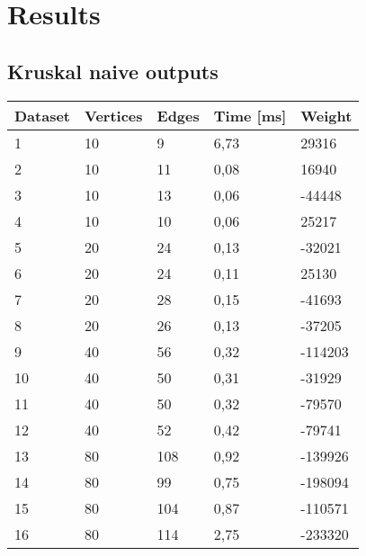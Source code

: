 \section{Results}

\subsection{Kruskal naive outputs}
\begin{longtable}{lllll}
    \textbf{Dataset} & \textbf{Vertices} & \textbf{Edges} & \textbf{Time [ms]} & \textbf{Weight} \\
    \endhead
    1                & 10             & 9              & 6,73        & 29316           \\
    2                & 10             & 11             & 0,08        & 16940           \\
    3                & 10             & 13             & 0,06        & -44448          \\
    4                & 10             & 10             & 0,06        & 25217           \\
    5                & 20             & 24             & 0,13        & -32021          \\
    6                & 20             & 24             & 0,11        & 25130           \\
    7                & 20             & 28             & 0,15        & -41693          \\
    8                & 20             & 26             & 0,13        & -37205          \\
    9                & 40             & 56             & 0,32        & -114203         \\
    10               & 40             & 50             & 0,31        & -31929          \\
    11               & 40             & 50             & 0,32        & -79570          \\
    12               & 40             & 52             & 0,42        & -79741          \\
    13               & 80             & 108            & 0,92        & -139926         \\
    14               & 80             & 99             & 0,75        & -198094         \\
    15               & 80             & 104            & 0,87        & -110571         \\
    16               & 80             & 114            & 2,75        & -233320         \\

\end{longtable}
